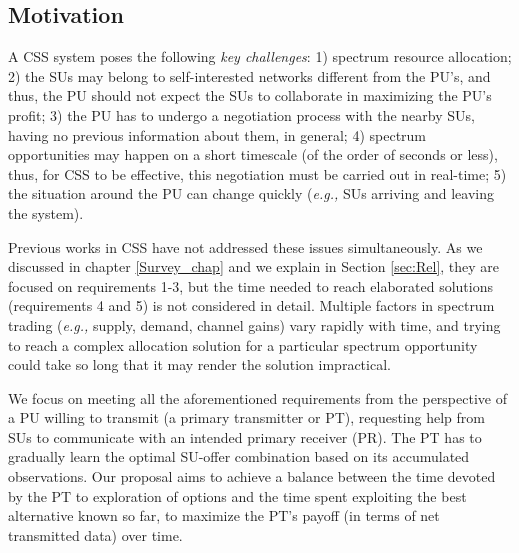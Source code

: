 \subsection{Motivation}
A CSS system poses the following \textit{key challenges}: 1) spectrum resource allocation; 2) the SUs may belong to self-interested networks different from the PU's, and thus, the PU should not expect the SUs to collaborate in maximizing the PU's profit; 3) the PU has to undergo a negotiation process with the nearby SUs, having no previous information about them, in general; 4) spectrum opportunities may happen on a short timescale (of the order of seconds or less), thus, for CSS to be effective, this negotiation must be carried out in real-time; 5) the situation around the PU can change quickly (\textit{e.g.,} SUs arriving and leaving the system). 

Previous works in CSS have not addressed these issues simultaneously. As we discussed in chapter \ref{Survey_chap} and we explain in Section \ref{sec:Rel}, they are focused on requirements 1-3, but the time needed to reach elaborated solutions (requirements 4 and 5) is not considered in detail. 
Multiple factors in spectrum trading (\textit{e.g.,} supply, demand, channel gains) vary rapidly with time, and trying to reach a complex allocation solution for a particular spectrum opportunity could take so long that it may render the solution impractical.

We focus on meeting all the aforementioned requirements from the perspective of a PU willing to transmit (a primary transmitter or PT), requesting help from SUs to communicate with an intended primary receiver (PR). The PT has to gradually learn the optimal SU-offer combination based on its accumulated observations. Our proposal aims to achieve a balance between the time devoted by the PT to exploration of options and the time spent exploiting the best alternative known so far, to maximize the PT's payoff (in terms of net transmitted data) over time.
